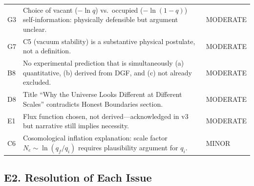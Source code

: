 \documentclass[reprint]{revtex4-2}
\begin{document}
\begin{table}[h]
\begin{tabular}{p{0.5cm}p{7cm}l}
G3 & Choice of vacant ($-\ln q$) vs.\ occupied ($-\ln(1-q)$) self-information: physically defensible but argument unclear. & MODERATE \\
G7 & C5 (vacuum stability) is a substantive physical postulate, not a definition. & MODERATE \\
B8 & No experimental prediction that is simultaneously (a) quantitative, (b) derived from DGF, and (c) not already excluded. & MODERATE \\
D8 & Title ``Why the Universe Looks Different at Different Scales'' contradicts Honest Boundaries section. & MODERATE \\
E1 & Flux function chosen, not derived---acknowledged in v3 but narrative still implies necessity. & MODERATE \\
C6 & Cosomological inflation explanation: scale factor $N_e \sim \ln(q_f/q_i)$ requires plausibility argument for $q_i$. & MINOR \\
\bottomrule
\end{tabular}
\end{table}

\subsection{E2. Resolution of Each Issue}
\end{document}
